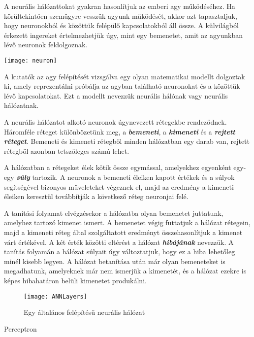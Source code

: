 
A neurális hálózattokat gyakran hasonlítjuk az emberi agy működéséhez. Ha körültekintően szemügyre vesszük agyunk működését, akkor azt tapasztaljuk, hogy neuronokból és közöttük felépülő kapcsolatokból áll össze. A külvilágból érkezett ingereket értelmezhetjük úgy, mint egy bemenetet, amit az agyunkban lévő neuronok feldolgoznak. 

\begin{center}
	\texttt{[image: neuron]}
\end{center}

A kutatók az agy felépítését vizsgálva egy olyan matematikai modellt dolgoztak ki, amely   reprezentálni próbálja az agyban található neuronokat és a közöttük lévő kapcsolatokat. Ezt a modellt nevezzük neurális hálónak vagy neurális hálózatnak.  

A neurális hálózatot alkotó neuronok úgynevezett rétegekbe rendeződnek. Háromféle réteget különbözetünk meg, a \textbf{\textit{bemeneti}}, a \textbf{\textit{kimeneti}} és a \textbf{\textit{rejtett réteget}}. Bemeneti és kimeneti rétegből minden hálózatban egy darab van, rejtett rétegből azonban tetszőleges számú lehet. 

A hálózatban a rétegeket élek kötik össze egymással, amelyekhez egyenként egy-egy \textbf{\textit{súly}} tartozik. A neuronok a bemeneti éleiken kapott értékek és a súlyok segítségével bizonyos műveleteket végeznek el, majd az eredmény a kimeneti éleiken keresztül továbbítják a következő réteg neuronjai felé. 

A tanítási folyamat elvégzésekor a hálózatba olyan bemenetet juttatunk, amelyhez tartozó kimenet ismert. A bemenetet végig futtatjuk a hálózat rétegein, majd a kimeneti réteg által szolgáltatott eredményt összehasonlítjuk a kimenet várt értékével. A két érték közötti eltérést a hálózat \textit{\textbf{hibájának}} nevezzük. A tanítás folyamán a hálózat súlyait úgy változtatjuk, hogy ez a hiba lehetőleg minél kisebb legyen. A hálózat betanítása után már olyan bemeneteket is megadhatunk, amelyeknek már nem ismerjük a kimenetét, és a hálózat ezekre is képes hibahatáron belüli kimenetet produkálni.\\

\begin{figure}
	\centering
	\texttt{[image: ANNLayers]}
	\caption{Egy általános felépítésű neurális hálózat}
\end{figure}

\begin{Large}
Perceptron
\end{Large}

